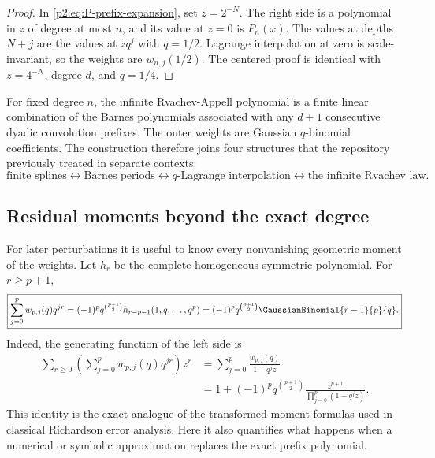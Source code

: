 \documentclass[11pt,oneside]{article}
\numberwithin{equation}{section}
\theoremstyle{definition}
\theoremstyle{remark}
\begin{document}
\begin{proof}
In \eqref{p2:eq:P-prefix-expansion}, set $z=2^{-N}$.  The right side is a polynomial in $z$ of degree
at most $n$, and its value at $z=0$ is $P_n(x)$.  The values at depths $N+j$ are the values at
$zq^j$ with $q=1/2$.  Lagrange interpolation at zero is scale-invariant, so the weights are
$w_{n,j}(1/2)$.  The centered proof is identical with $z=4^{-N}$, degree $d$, and $q=1/4$.
\end{proof}

\begin{resultbox}
For fixed degree $n$, the infinite Rvachev-Appell polynomial is a finite linear combination of the
Barnes polynomials associated with any $d+1$ consecutive dyadic convolution prefixes.  The outer
weights are Gaussian $q$-binomial coefficients.  The construction therefore joins four structures
that the repository previously treated in separate contexts:
\[
 \text{finite splines}
 \longleftrightarrow
 \text{Barnes periods}
 \longleftrightarrow
 \text{$q$-Lagrange interpolation}
 \longleftrightarrow
 \text{the infinite Rvachev law}.
\]
\end{resultbox}

\subsection{Residual moments beyond the exact degree}

For later perturbations it is useful to know every nonvanishing geometric moment of the weights.
Let $h_r$ be the complete homogeneous symmetric polynomial.  For $r\ge p+1$,
\begin{equation}
 \boxed{
 \sum_{j=0}^{p}w_{p,j}(q)q^{jr}
 =(-1)^pq^{\binom{p+1}{2}}
 h_{r-p-1}(1,q,\ldots,q^p)
 =(-1)^pq^{\binom{p+1}{2}}\GaussianBinomial{r-1}{p}{q}.
 }
 \label{p2:eq:w-residual}
\end{equation}
Indeed, the generating function of the left side is
\begin{align*}
 \sum_{r\ge0}\left(\sum_{j=0}^{p}w_{p,j}(q)q^{jr}\right)z^r
 &=\sum_{j=0}^{p}\frac{w_{p,j}(q)}{1-q^jz}\\
 &=1+(-1)^pq^{\binom{p+1}{2}}
 \frac{z^{p+1}}{\prod_{j=0}^{p}(1-q^jz)}.
\end{align*}
This identity is the exact analogue of the transformed-moment formulas used in classical
Richardson error analysis.  Here it also quantifies what happens when a numerical or symbolic
approximation replaces the exact prefix polynomial.
\end{document}
